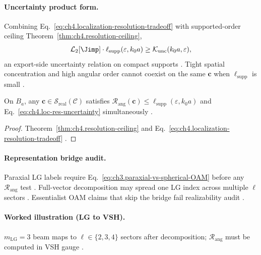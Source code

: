 
\paragraph{Uncertainty product form.}
Combining Eq.~\eqref{eq:ch4.localization-resolution-tradeoff} with supported-order ceiling Theorem~\ref{thm:ch4.resolution-ceiling},
\begin{equation}
\label{eq:ch4.loc-res-uncertainty}
\mathcal{L}_{2}[\Jimp]\cdot\ell_{\mathrm{supp}}(\varepsilon,k_{0}a)
\ge
\mathcal{K}_{\mathrm{unc}}(k_{0}a,\varepsilon),
\end{equation}
an export-side uncertainty relation on compact supports \cite{hansen1988,jackson1999,stratton1941,harrington2001,devaney2004}. Tight spatial
concentration and high angular order cannot coexist on the same \(\mathbf{c}\) when \(\ell_{\mathrm{supp}}\) is small \cite{hansen1988}.

\begin{theorem}
\label{thm:ch4.joint-loc-supp}
On \(B_{a}\), any \(\mathbf{c}\in\mathcal{S}_{\mathrm{real}}(\mathcal{C})\) satisfies
\(\mathcal{R}_{\mathrm{ang}}(\mathbf{c})\le\ell_{\mathrm{supp}}(\varepsilon,k_{0}a)\) and
Eq.~\eqref{eq:ch4.loc-res-uncertainty} simultaneously \cite{hansen1988,stratton1941,harrington2001,devaney2004}.
\end{theorem}
\begin{proof}
Theorem~\ref{thm:ch4.resolution-ceiling} and Eq.~\eqref{eq:ch4.localization-resolution-tradeoff} \cite{hansen1988,stratton1941}.
\end{proof}

\paragraph{Representation bridge audit.}
Paraxial LG labels require Eq.~\eqref{eq:ch3.paraxial-vs-spherical-OAM} before any \(\mathcal{R}_{\mathrm{ang}}\) test
\cite{harrington2001,allen1992}. Full-vector decomposition may spread one LG index across multiple \(\ell\) sectors
\cite{hansen1988,stratton1941,belinfante1940}. Essentialist OAM claims that skip the bridge fail realizability audit \cite{devaney2004}.

\paragraph{Worked illustration (LG to VSH).}
\(m_{\mathrm{LG}}=3\) beam maps to \(\ell\in\{2,3,4\}\) sectors after decomposition; \(\mathcal{R}_{\mathrm{ang}}\) must be computed in VSH gauge
\cite{harrington2001,hansen1988,allen1992}.

